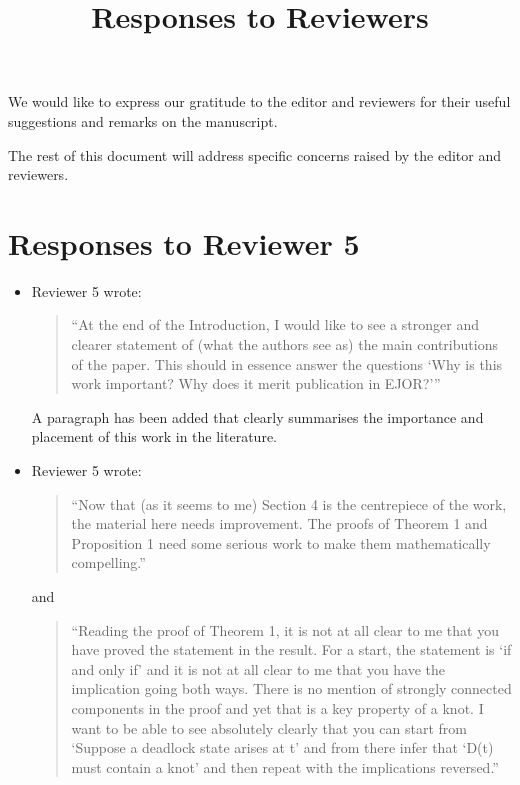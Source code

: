 \documentclass{article}
\title{Responses to Reviewers}
\author{}
\date{}
\begin{document}
\maketitle

We would like to express our gratitude to the editor and reviewers for their
useful suggestions and remarks on the manuscript.

The rest of this document will address specific concerns raised by the editor
and reviewers.

\section*{Responses to Reviewer 5}

\begin{itemize}

\item Reviewer 5 wrote:
\begin{quote}
``At the end of the Introduction, I would like to see a stronger and clearer
statement of (what the authors see as) the main contributions of the paper.
This should in essence answer the questions ‘Why is this work important? Why
does it merit publication in EJOR?’''
\end{quote}

A paragraph has been added that clearly summarises the importance and placement
of this work in the literature.

\item Reviewer 5 wrote:
\begin{quote}
``Now that (as it seems to me) Section 4 is the centrepiece of the work, the
material here needs improvement. The proofs of Theorem 1 and Proposition 1 need
some serious work to make them mathematically compelling.''
\end{quote}

and

\begin{quote}
``Reading the proof of Theorem 1, it is not at all clear to me that you have
proved the statement in the result. For a start, the statement is ‘if and only
if’ and it is not at all clear to me that you have the implication going both
ways. There is no mention of strongly connected components in the proof and yet
that is a key property of a knot. I want to be able to see absolutely clearly
that you can start from ‘Suppose a deadlock state arises at t’ and from there
infer that ‘D(t) must contain a knot’ and then repeat with the implications
reversed.''
\end{quote}


\end{itemize}
\end{document}

